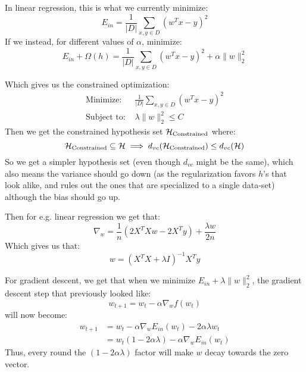     In linear regression, this is what we currently minimize:
    \begin{equation*}
        E_{in} = \frac{1}{|D|} \sum_{x,y \in D}(w^Tx-y)^2
    \end{equation*}
    If we instead, for different values of $\alpha$, minimize:
    \begin{equation*}
    E_{in}+\Omega(h) = \frac{1}{|D|} \sum_{x,y \in D}(w^Tx-y)^2 + 
    \alpha\|w\|^2_2
    \end{equation*}
    
    Which gives us the constrained optimization:
    \begin{align*}
        \text{Minimize: }&\frac{1}{|D|}\sum_{x,y \in D} (w^Tx - y)^2\\
        \text{Subject to: }&\lambda\|w\|^2_2\leq C
    \end{align*}
    Then we get the constrained hypothesis set $\mathcal{H}_{\text{Constrained}}$ where:
    \begin{equation*}
        \mathcal{H}_\text{Constrained} \subseteq \mathcal{H} \implies 
        d_{vc}(\mathcal{H}_\text{Constrained}) \leq d_{vc}(\mathcal{H})
    \end{equation*}
    So we get a simpler hypothesis set (even though $d_{vc}$ might be the 
    same), which also means the variance should go down (as the regularization 
    favors $h$'s that look alike, and rules out the ones that are specialized 
    to a single data-set) although the bias should go up.
    
    Then for e.g. linear regression we get that:
    \begin{equation*}
        \nabla_w=\frac{1}{n}(2X^TXw-2X^Ty) + \frac{\lambda w}{2n}
    \end{equation*}
    Which gives us that:
    \begin{equation*}
        w = (X^TX+\lambda I)^{-1}X^Ty
    \end{equation*}
    
    For gradient descent, we get that when we minimize $E_{in} + \lambda 
    \|w\|^2_2$, the gradient descent step that previously looked like:
    \begin{equation*}
        w_{t+1} = w_t - \alpha \nabla_w f(w_t)
    \end{equation*}
    will now become:
    \begin{align*}
        w_{t+1} &= w_t - \alpha \nabla_w E_{in}(w_t) - 2 \alpha \lambda w_t\\
            &= w_t(1-2 \alpha \lambda) - \alpha \nabla_w E_{in}(w_t)
    \end{align*}
    Thus, every round the $(1-2\alpha \lambda)$ factor will make $w$ decay 
    towards the zero vector.
    
